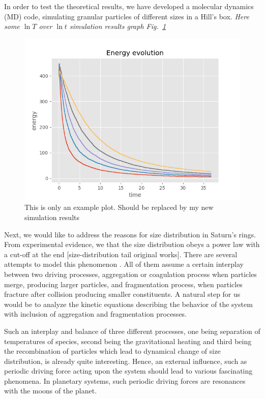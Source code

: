 \documentclass[11pt, notitlepage]{article} %
\begin{document}
In order to test the theoretical results, we have developed a molecular dynamics (MD) 
code, simulating granular particles of different sizes in a Hill's box. 
\emph{Here some $\ln T$ over $\ln t$ simulation results graph Fig.~\ref{fig2}}
\begin{figure}[h] %
	\centering
	\includegraphics[scale = .80]{Figures/energy_evo.png}
	\caption{\footnotesize This is only an example plot. Should be replaced by my new simulation results}
	\label{fig2}
\end{figure}

Next, we would like to address the reasons for size distribution in Saturn's rings. 
From experimental evidence, we that the size distribution obeys a power
law with a cut-off at the end [size-distribution tail original works]. There are several attempts
to model this phenomenon \cite{Brilliantov2013,spahn2014}. All of them assume a certain interplay between
two driving processes, aggregation or coagulation process when particles merge, producing 
larger particles, and fragmentation process, when particles
fracture after collision producing smaller constituents. A natural step for us would be 
to analyze the kinetic equations describing the behavior of the system with inclusion 
of aggregation and fragmentation processes.

Such an interplay and balance of three different processes, one being separation of 
temperatures of species, second being the gravitational heating and third 
being the recombination of particles which lead to dynamical change of size distribution,
is already quite interesting. Hence, an external influence, such as periodic 
driving force acting upon the system should lead to various fascinating phenomena.
In planetary systems, such periodic driving forces are resonances with the moons of the 
planet.
\end{document}
